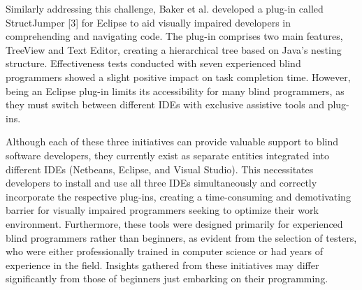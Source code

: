 Similarly addressing this challenge, Baker et al. developed a plug-in called StructJumper [3] for Eclipse to aid visually impaired developers in comprehending and navigating code. The plug-in comprises two main features, TreeView and Text Editor, creating a hierarchical tree based on Java's nesting structure. Effectiveness tests conducted with seven experienced blind programmers showed a slight positive impact on task completion time.
However, being an Eclipse plug-in limits its accessibility for many blind programmers, as they must switch between different IDEs with exclusive assistive tools and plug-ins.

Although each of these three initiatives can provide valuable support
to blind software developers, they currently exist as separate
entities integrated into different IDEs (Netbeans, Eclipse, and Visual
Studio). This necessitates developers to install and use all three
IDEs simultaneously and correctly incorporate the respective plug-ins,
creating a time-consuming and demotivating barrier for visually
impaired programmers seeking to optimize their work environment.
Furthermore, these tools were designed primarily for experienced blind
programmers rather than beginners, as evident from the selection of
testers, who were either professionally trained in computer science or
had years of experience in the field.
Insights gathered from these initiatives may differ significantly from
those of beginners just embarking on their programming.






